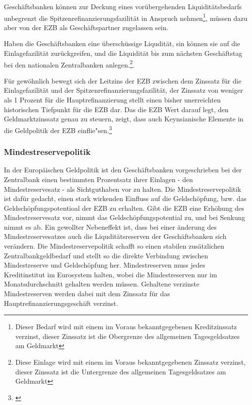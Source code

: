 \documentclass[
        onecolumn,
        a4paper,
        abstracton,
        parskip=half
        ,final
        ]{scrartcl}
\begin{document}
Gesch{\"a}ftsbanken k{\"o}nnen zur Deckung eines vor{\"u}bergehenden Liquidit{\"a}tsbedarfs unbegrenzt die Spitzenrefinanzierungsfazilit{\"a}t in Anspruch nehmen\footnote[36]{Dieser Bedarf wird mit einem im Voraus bekanntgegebenen Kreditzinssatz verzinst, dieser Zinssatz ist die Obergrenze des allgemeinen Tagesgeldsatzes am Geldmarkt}, m{\"u}ssen dazu aber von der EZB als Gesch{\"a}ftspartner zugelassen sein.

Haben die Gesch{\"a}ftsbanken eine {\"u}bersch{\"u}ssige Liqudit{\"a}t, sin k{\"o}nnen sie auf die Einlagefazilit{\"a}t zur{\"u}ckgreifen, und die Liquidit{\"a}t bis zum n{\"a}chsten Gesch{\"a}ftstag bei den nationalen Zentralbanken anlegen.\footnote[37]{Diese Einlage wird mit einem im Voraus bekanntgegebenen Zinssatz verzinst, dieser Zinssatz ist die Untergrenze des allgemeinen Tagesgeldsatzes am Geldmarkt}.

F{\"u}r gew{\"o}hnlich bewegt sich der Leitzins der EZB zwischen dem Zinssatz f{\"u}r die Einlagefazilit{\"a}t und der Spitzenrefinanzierungsfazilit{\"a}t, der Zinssatz von weniger als 1 Prozent f{\"u}r die Hauptrefinanzierung stellt einen bisher unerreichten historischen Tiefpunkt f{\"u}r die EZB dar.
Das die EZB Wert darauf legt, den Geldmarktzinssatz genau zu steuern, zeigt, dass auch Keynsianische Elemente in die Geldpolitik der EZB einflie{"s}en.\footnote[59]{\citep[vgl.][S.562f]{Basseler2010}}

\subsubsection{Mindestreservepolitik}   %
In der Europ{\"a}ischen Geldpolitik ist den Gesch{\"a}ftsbanken vorgeschrieben bei der Zentralbank einen bestimmten Prozentsatz ihrer Einlagen - den Mindestreservesatz - als Sichtguthaben vor zu halten. Die Mindestreservepolitik\citep[vgl.][S.562f]{Basseler2010} ist daf{\"u}r gedacht, einen stark wirkenden Einfluss auf die Geldsch{\"o}pfung, bzw. das Geldsch{\"o}pfungspotentioal der EZB zu erhalten. Gibt die EZB eine Erh{\"o}hung des Mindestreservesatz vor, nimmt das Geldsch{\"o}pfungspotential zu, und bei Senkung nimmt es ab. Ein gewollter Nebeneffekt ist, dass bei einer {\"a}nderung des Mindestreservesatzes auch die Liqudit{\"a}tsreserven der Gesch{\"a}ftsbanken sich ver{\"a}ndern.
Die Mindestreservepolitik schafft so einen stabilen zus{\"a}tzlichen Zentralbankgeldbedarf und stellt so die direkte Verbindung zwischen Mindestreserve und Geldsch{\"o}pfung her.
Mindestreserven muss jedes Kreditinstitut im Eurosystem halten, wobei die Mindestreserven nur im Monatsdurchschnitt gehalten werden m{\"u}ssen. Gehaltene verzinste Mindestreserven werden dabei mit dem Zinssatz f{\"u}r das Hauptrefinanzierungsgesch{\"a}ft verzinst.
\end{document}
